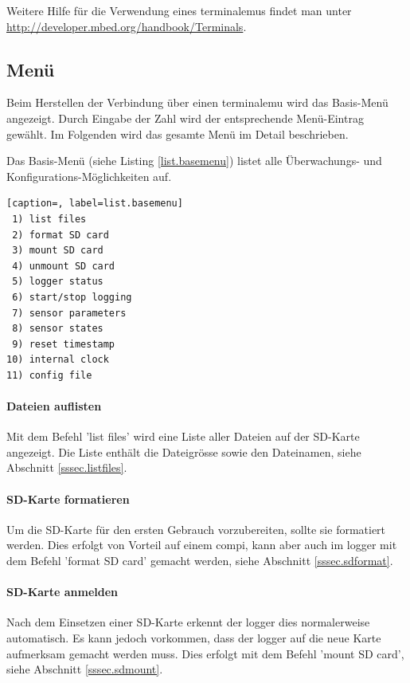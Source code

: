 Weitere Hilfe für die Verwendung eines \gls{terminalemu}s findet man unter \url{http://developer.mbed.org/handbook/Terminals}.



\subsection{Menü}\label{ssec.menu}
Beim Herstellen der Verbindung über einen \gls{terminalemu} wird das Basis-Menü angezeigt. Durch Eingabe der Zahl wird der entsprechende Menü-Eintrag gewählt. Im Folgenden wird das gesamte Menü im Detail beschrieben.

Das Basis-Menü (siehe Listing \ref{list.basemenu}) listet alle Überwachungs- und Konfigurations-Möglichkeiten auf. 

\begin{lstlisting}[caption=, label=list.basemenu]
 1) list files
 2) format SD card
 3) mount SD card
 4) unmount SD card
 5) logger status
 6) start/stop logging
 7) sensor parameters
 8) sensor states
 9) reset timestamp
10) internal clock
11) config file
\end{lstlisting}

\paragraph{Dateien auflisten} Mit dem Befehl 'list files' wird eine Liste aller Dateien auf der SD-Karte angezeigt. Die Liste enthält die Dateigrösse sowie den Dateinamen, siehe Abschnitt \ref{sssec.listfiles}.

\paragraph{SD-Karte formatieren} Um die SD-Karte für den ersten Gebrauch vorzubereiten, sollte sie formatiert werden. Dies erfolgt von Vorteil auf einem \gls{compi}, kann aber auch im \gls{logger} mit dem Befehl 'format SD card' gemacht werden, siehe Abschnitt \ref{sssec.sdformat}.

\paragraph{SD-Karte anmelden} Nach dem Einsetzen einer SD-Karte erkennt der \gls{logger} dies normalerweise automatisch. Es kann jedoch vorkommen, dass der \gls{logger} auf die neue Karte aufmerksam gemacht werden muss. Dies erfolgt mit dem Befehl 'mount SD card', siehe Abschnitt \ref{sssec.sdmount}.

